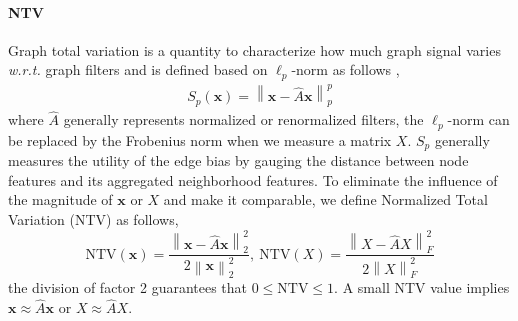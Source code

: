 \documentclass{article}
\newcommand\wrt{\textit{w.r.t.}}
\newcommand{\norm}[1]{\left\lVert#1\right\rVert}
\newcommand{\0}{{\boldsymbol{0}}}
\newcommand{\6}{{\partial}}
\newcommand{\8}{{\infty}}
\newcommand{\4}{{\nabla}}
\providecommand{\norm}[1]{\lVert#1\rVert}
\begin{document}
\paragraph{NTV} Graph total variation is a quantity to characterize how much graph signal varies \wrt{} graph filters and is defined based on $\ell_p$-norm as follows \cite{chen2015signal,ahmed2017graph},
\begin{align*}
    S_p(\bm{x}) = \norm{\bm{x} - \hat{A} \bm{x}}_p^p
\end{align*}
where $\hat{A}$ generally represents normalized or renormalized filters, the $\ell_p$-norm can be replaced by the Frobenius norm when we measure a matrix $X$. $S_p$ generally measures the utility of the edge bias by gauging the distance between node features and its aggregated neighborhood features. To eliminate the influence of the magnitude of $\bm{x}$ or $X$ and make it comparable, we define Normalized Total Variation (NTV) as follows,
\begin{equation}
    \text{NTV}(\bm{x}) = \frac{\norm{\bm{x} - \hat{A} \bm{x}}_2^2}{2 \norm{\bm{x}}_2^2}, \ \text{NTV}(X) = \frac{\norm{X - \hat{A} X}_F^2}{2 \norm{X}_F^2}
\end{equation}
the division of factor 2 guarantees that $0\leq \text{NTV} \leq 1$. A small NTV value implies $\bm{x} \approx \hat{A} \bm{x}$ or $X \approx \hat{A} X$.
\end{document}

